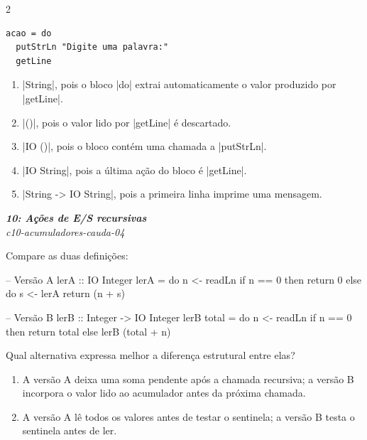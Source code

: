 \documentclass[a4paper,10pt,brazil]{article}
\begin{document}
\begin{multicols}{2}
\begin{verbatim}
acao = do
  putStrLn "Digite uma palavra:"
  getLine
\end{verbatim}

\begin{enumerate}
  \item \haskellinline|String|, pois o bloco \haskellinline|do| extrai automaticamente o valor produzido por \haskellinline|getLine|.

  \item \haskellinline|()|, pois o valor lido por \haskellinline|getLine| é descartado.

  \item \haskellinline|IO ()|, pois o bloco contém uma chamada a \haskellinline|putStrLn|.

  \item \haskellinline|IO String|, pois a última ação do bloco é \haskellinline|getLine|.

  \item \haskellinline|String -> IO String|, pois a primeira linha imprime uma mensagem.


\end{enumerate}

\begin{flushright}
  \footnotesize
  \textit{\textbf{10: Ações de E/S recursivas}}\\
  \textit{c10-acumuladores-cauda-04}\\

\end{flushright}
Compare as duas definições:

\begin{haskellcode}
-- Versão A
lerA :: IO Integer
lerA = do
  n <- readLn
  if n == 0
    then return 0
    else do
      s <- lerA
      return (n + s)

-- Versão B
lerB :: Integer -> IO Integer
lerB total = do
  n <- readLn
  if n == 0
    then return total
    else lerB (total + n)
\end{haskellcode}

Qual alternativa expressa melhor a diferença estrutural entre elas?

\begin{enumerate}
  \item A versão A deixa uma soma pendente após a chamada recursiva; a versão B incorpora o valor lido ao acumulador antes da próxima chamada.

  \item A versão A lê todos os valores antes de testar o sentinela; a versão B testa o sentinela antes de ler.


\end{enumerate}
\end{multicols}
\end{document}
